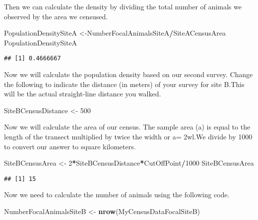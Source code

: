 \documentclass[]{book}
\newenvironment{Shaded}{\begin{snugshade}}{\end{snugshade}}
\newcommand{\DecValTok}[1]{\textcolor[rgb]{0.00,0.00,0.81}{#1}}
\newcommand{\KeywordTok}[1]{\textcolor[rgb]{0.13,0.29,0.53}{\textbf{#1}}}
\newcommand{\NormalTok}[1]{#1}
\newcommand{\OperatorTok}[1]{\textcolor[rgb]{0.81,0.36,0.00}{\textbf{#1}}}
\newcommand{\StringTok}[1]{\textcolor[rgb]{0.31,0.60,0.02}{#1}}
\begin{document}
Then we can calculate the density by dividing the total number of animals we observed by the area we censused.

\begin{Shaded}
\begin{Highlighting}[]
\NormalTok{PopulationDensitySiteA <-NumberFocalAnimalsSiteA}\OperatorTok{/}\NormalTok{SiteACensusArea}
\NormalTok{PopulationDensitySiteA}
\end{Highlighting}
\end{Shaded}

\begin{verbatim}
## [1] 0.4666667
\end{verbatim}

Now we will calculate the population density based on our second survey. Change the following to indicate the distance (in meters) of your survey for site B.This will be the actual straight-line distance you walked.

\begin{Shaded}
\begin{Highlighting}[]
\NormalTok{SiteBCensusDistance <-}\StringTok{ }\DecValTok{500}
\end{Highlighting}
\end{Shaded}

Now we will calculate the area of our census. The sample area (a) is equal to the length of the transect multiplied by twice the width or a= 2wl.We divide by 1000 to convert our answer to square kilometers.

\begin{Shaded}
\begin{Highlighting}[]
\NormalTok{SiteBCensusArea <-}\StringTok{ }\DecValTok{2}\OperatorTok{*}\NormalTok{SiteBCensusDistance}\OperatorTok{*}\NormalTok{CutOffPoint}\OperatorTok{/}\DecValTok{1000}
\NormalTok{SiteBCensusArea}
\end{Highlighting}
\end{Shaded}

\begin{verbatim}
## [1] 15
\end{verbatim}

Now we need to calculate the number of animals using the following code.

\begin{Shaded}
\begin{Highlighting}[]
\NormalTok{NumberFocalAnimalsSiteB <-}\StringTok{ }\KeywordTok{nrow}\NormalTok{(MyCensusDataFocalSiteB)}
\end{Highlighting}
\end{Shaded}
\end{document}
